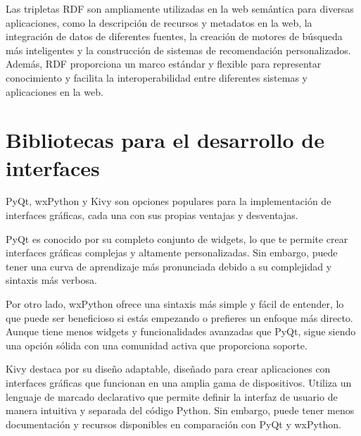 Las tripletas RDF son ampliamente utilizadas en la web semántica para diversas aplicaciones, como la descripción de recursos y metadatos en la web, la integración de datos de diferentes fuentes, la creación de motores de búsqueda más inteligentes y la construcción de sistemas de recomendación personalizados. Además, RDF proporciona un marco estándar y flexible para representar conocimiento y facilita la interoperabilidad entre diferentes sistemas y aplicaciones en la web.

\section{Bibliotecas para el desarrollo de interfaces}

PyQt, wxPython y Kivy son opciones populares para la implementación de interfaces gráficas, cada una con sus propias ventajas y desventajas.

PyQt es conocido por su completo conjunto de widgets, lo que te permite crear interfaces gráficas complejas y altamente personalizadas. Sin embargo, puede tener una curva de aprendizaje más pronunciada debido a su complejidad y sintaxis más verbosa.

Por otro lado, wxPython ofrece una sintaxis más simple y fácil de entender, lo que puede ser beneficioso si estás empezando o prefieres un enfoque más directo. Aunque tiene menos widgets y funcionalidades avanzadas que PyQt, sigue siendo una opción sólida con una comunidad activa que proporciona soporte.

Kivy destaca por su diseño adaptable, diseñado para crear aplicaciones con interfaces gráficas que funcionan en una amplia gama de dispositivos. Utiliza un lenguaje de marcado declarativo que permite definir la interfaz de usuario de manera intuitiva y separada del código Python. Sin embargo, puede tener menos documentación y recursos disponibles en comparación con PyQt y wxPython.







